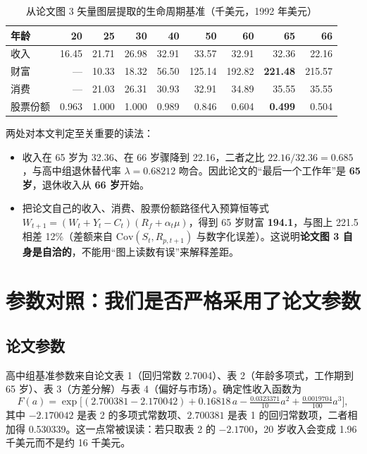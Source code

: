 \documentclass[UTF8,a4paper,11pt,fontset=fandol]{ctexart}
\begin{document}
\begin{table}[htbp]\centering\small
\caption{从论文图 3 矢量图层提取的生命周期基准（千美元，1992 年美元）}\vspace{-2pt}
\begin{tabular}{@{}lrrrrrrrr@{}}\toprule
年龄 & 20 & 25 & 30 & 40 & 50 & 60 & 65 & 66\\\midrule
收入 & 16.45 & 21.71 & 26.98 & 32.91 & 33.57 & 32.91 & 32.36 & 22.16\\
财富 & --- & 10.33 & 18.32 & 56.50 & 125.14 & 192.82 & \textbf{221.48} & 215.57\\
消费 & --- & 21.03 & 26.31 & 30.93 & 32.91 & 34.89 & 35.55 & 35.55\\
股票份额 & 0.963 & 1.000 & 1.000 & 0.989 & 0.846 & 0.604 & \textbf{0.499} & 0.504\\\bottomrule
\end{tabular}
\end{table}

两处对本文判定至关重要的读法：
\begin{itemize}[leftmargin=1.6em,itemsep=1pt]
\item 收入在 65 岁为 32.36、在 66 岁骤降到 22.16，二者之比 \(22.16/32.36=0.685\)，与高中组退休替代率 \(\lambda=0.68212\) 吻合。因此论文的“最后一个工作年”是 \textbf{65 岁}，退休收入从 \textbf{66 岁}开始。
\item 把论文自己的收入、消费、股票份额路径代入预算恒等式 \(W_{t+1}=(W_t+Y_t-C_t)(R_f+\alpha_t\mu)\)，得到 65 岁财富 \textbf{194.1}，与图上 221.5 相差 12\%（差额来自 \(\mathrm{Cov}(S_t,R_{p,t+1})\) 与数字化误差）。这说明\textbf{论文图 3 自身是自洽的}，不能用“图上读数有误”来解释差距。
\end{itemize}

\section{参数对照：我们是否严格采用了论文参数}

\subsection{论文参数}
高中组基准参数来自论文表 1（回归常数 2.7004）、表 2（年龄多项式，工作期到 65 岁）、表 3（方差分解）与表 4（偏好与市场）。确定性收入函数为
\begin{equation}
F(a)=\exp\big[(2.700381-2.170042)+0.16818\,a-\tfrac{0.0323371}{10}a^2+\tfrac{0.0019704}{100}a^3\big],
\end{equation}
其中 \(-2.170042\) 是表 2 的多项式常数项、\(2.700381\) 是表 1 的回归常数项，二者相加得 0.530339。这一点常被误读：若只取表 2 的 \(-2.1700\)，20 岁收入会变成 1.96 千美元而不是约 16 千美元。
\end{document}
